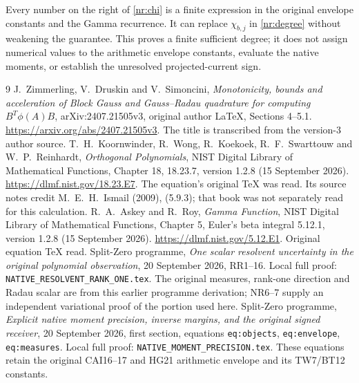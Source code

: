 \documentclass[11pt]{article}
\begin{document}
Every number on the right of \eqref{nr:chi} is a finite expression
in the original envelope constants and the Gamma recurrence. It
can replace $\chi_{b,j}$ in \eqref{nr:degree} without weakening the
guarantee. This proves a finite sufficient degree; it does not assign
numerical values to the arithmetic envelope constants, evaluate the
native moments, or establish the unresolved projected-current sign.

\begin{thebibliography}{9}
 J.~Zimmerling, V.~Druskin and V.~Simoncini,
\emph{Monotonicity, bounds and acceleration of Block Gauss and
Gauss--Radau quadrature for computing $B^T\phi(A)B$},
arXiv:2407.21505v3, original author LaTeX, Sections 4--5.1.
\url{https://arxiv.org/abs/2407.21505v3}.
The title is transcribed from the version-3 author source.
 T.~H.~Koornwinder, R.~Wong, R.~Koekoek,
R.~F.~Swarttouw and W.~P.~Reinhardt, \emph{Orthogonal Polynomials},
NIST Digital Library of Mathematical Functions, Chapter 18,
18.23.7, version 1.2.8 (15 September 2026).
\url{https://dlmf.nist.gov/18.23.E7}.
The equation's original TeX was read. Its source notes credit
M.~E.~H.~Ismail (2009), (5.9.3); that book was not separately read
for this calculation.
 R.~A.~Askey and R.~Roy, \emph{Gamma Function},
NIST Digital Library of Mathematical Functions, Chapter 5,
Euler's beta integral 5.12.1, version 1.2.8 (15 September 2026).
\url{https://dlmf.nist.gov/5.12.E1}. Original equation TeX read.
 Split-Zero programme,
\emph{One scalar resolvent uncertainty in the original polynomial observation},
20 September 2026, RR1--16. Local full proof:
\texttt{NATIVE\_RESOLVENT\_RANK\_ONE.tex}.
The original measures, rank-one direction and Radau scalar are from
this earlier programme derivation; NR6--7 supply an independent
variational proof of the portion used here.
 Split-Zero programme,
\emph{Explicit native moment precision, inverse margins, and the original
signed receiver}, 20 September 2026, first section, equations
\texttt{eq:objects}, \texttt{eq:envelope}, \texttt{eq:measures}.
Local full proof: \texttt{NATIVE\_MOMENT\_PRECISION.tex}.
These equations retain the original CAI16--17 and HG21
arithmetic envelope and its TW7/BT12 constants.
\end{thebibliography}
\end{document}
